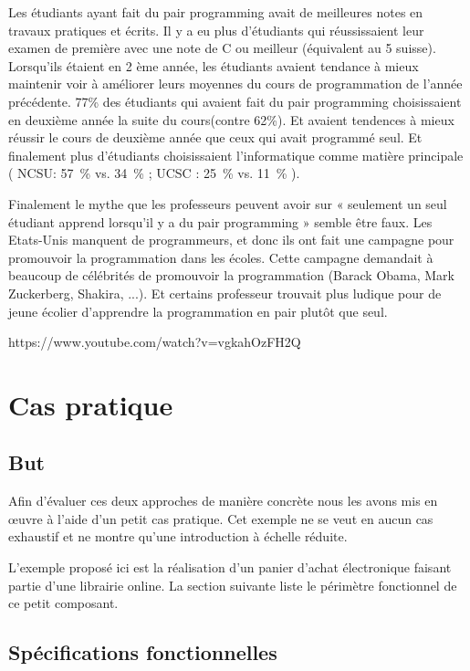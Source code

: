 \documentclass[journal, a4paper, frenchb]{IEEEtran}
\begin{document}
Les étudiants ayant fait du pair programming avait de meilleures notes en travaux pratiques et écrits. Il y a eu plus d’étudiants qui réussissaient leur examen de première avec une note de C ou meilleur (équivalent au 5 suisse). Lorsqu’ils étaient en 2 ème année, les étudiants avaient tendance à mieux maintenir voir à améliorer leurs moyennes du cours de programmation de l’année précédente. 77\% des étudiants qui avaient fait du pair programming choisissaient en deuxième année la suite du cours(contre 62\%). Et avaient tendences à mieux réussir le cours de deuxième année que ceux qui avait programmé seul. Et finalement plus d’étudiants choisissaient l’informatique comme matière principale ( NCSU: 57~\% vs. 34~\% ; UCSC : 25~\% vs. 11~\% ).

Finalement le mythe que les professeurs peuvent avoir sur « seulement un seul étudiant apprend lorsqu’il y a du pair programming » semble être faux. Les Etats-Unis manquent de programmeurs, et donc ils ont fait une campagne pour promouvoir la programmation dans les écoles. Cette campagne demandait à beaucoup de célébrités de promouvoir la programmation (Barack Obama, Mark Zuckerberg, Shakira, ...). Et certains professeur trouvait plus ludique pour de jeune écolier d’apprendre la programmation en pair plutôt que seul.

https://www.youtube.com/watch?v=vgkahOzFH2Q

\section{Cas pratique}

\subsection{But}

Afin d'évaluer ces deux approches de manière concrète nous les avons mis en œuvre à l'aide d'un petit cas pratique. Cet exemple ne se veut en aucun cas exhaustif et ne montre qu'une introduction à échelle réduite.

L'exemple proposé ici est la réalisation d'un panier d'achat électronique faisant partie d'une librairie online. La section suivante liste le périmètre fonctionnel de ce petit composant.

\subsection{Spécifications fonctionnelles}
\end{document}
